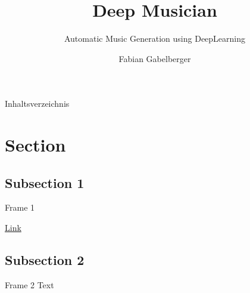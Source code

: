 \documentclass[xcolor={dvipsnames},10pt]{beamer}
\title{Deep Musician}
\subtitle{Automatic Music Generation using DeepLearning}
\author{Fabian Gabelberger}
\begin{document}
\maketitle

\begingroup
{}
\begin{frame}{Inhaltsverzeichnis}
    \begin{multicols}{3}
        \tableofcontents
    \end{multicols}
\end{frame}
\endgroup


\section{Section}
\subsection{Subsection 1}
\begin{frame}{Frame 1}

    \href{https://www.google.de/}{Link}
\end{frame}

\subsection{Subsection 2}
\begin{frame}{Frame 2}
    Text
\end{frame}
\end{document}
